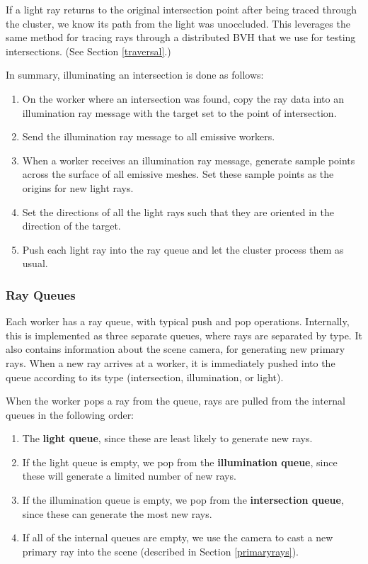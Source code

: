\documentclass[a4paper,twoside]{article}
\begin{document}
If a light ray returns to the original intersection point after being
traced through the cluster, we know its path from the light was unoccluded.
This leverages the same method for tracing rays through a distributed BVH that
we use for testing intersections. (See Section \ref{traversal}.)

In summary, illuminating an intersection is done as follows:

\begin{enumerate}
    \item On the worker where an intersection was found, copy the ray data into
        an illumination ray message with the target set to the point of
        intersection.
    \item Send the illumination ray message to all emissive workers.
    \item When a worker receives an illumination ray message, generate sample
        points across the surface of all emissive meshes. Set these sample
        points as the origins for new light rays.
    \item Set the directions of all the light rays such that they are oriented
        in the direction of the target.
    \item Push each light ray into the ray queue and let the cluster process
        them as usual.
\end{enumerate}


\subsubsection {Ray Queues}
\label{queues}

Each worker has a ray queue, with typical push and pop operations. Internally,
this is implemented as three separate queues, where rays are separated by type.
It also contains information about the scene camera, for generating new primary
rays. When a new ray arrives at a worker, it is immediately pushed into the queue
according to its type (intersection, illumination, or light).

When the worker pops a ray from the queue, rays are pulled from the internal
queues in the following order:

\begin{enumerate}
   \item The \textbf{light queue}, since these are least likely to generate
      new rays.
   \item If the light queue is empty, we pop from the \textbf{illumination queue},
      since these will generate a limited number of new rays.
   \item If the illumination queue is empty, we pop from the
      \textbf{intersection queue}, since these can generate the most new rays.
   \item If all of the internal queues are empty, we use the camera to cast a
      new primary ray into the scene (described in Section \ref{primaryrays}).
\end{enumerate}
\end{document}
